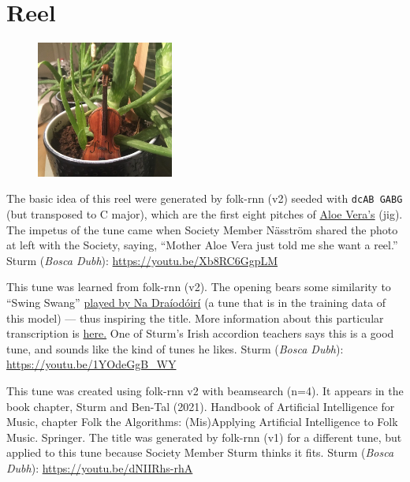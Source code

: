 \documentclass[a4paper,notitlepage,twoside]{book}
\begin{document}
\section{Reel}
{}  
\hypertarget{reel:AloeVeras}{}
\begin{figure}
\vspace{-0.3in}
\includegraphics[width=0.4\textwidth]{AloeVera2.jpg}
\end{figure}
The basic idea of this reel were generated by folk-rnn (v2) 
seeded with {\tt dcAB GABG} (but transposed to C major), 
which are the first eight pitches of \hyperlink{jig:AloeVeras}{Aloe Vera's} (jig).
The impetus of the tune came when Society Member Näsström shared the photo at left with the Society,
saying, ``Mother Aloe Vera just told me she want a reel.''
Sturm ({\em Bosca Dubh}): \url{https://youtu.be/Xb8RC6GgpLM}

\clearpage
{}
{}  
\hypertarget{reel:SwingSwangSwung}{}
This tune was learned from folk-rnn (v2).
The opening bears some similarity to ``Swing Swang'' 
\href{https://youtu.be/Fl3e4010epE?t=50}{played by Na Dra\'iod\'oir\'i}
(a tune that is in the training data of this model) ---
thus inspiring the title.
More information about this particular transcription is \href{https://highnoongmt.wordpress.com/2018/01/03/making-sense-of-the-folk-rnn-v2-model-part-5/}{here.}
One of Sturm's Irish accordion teachers says this is a good tune, and sounds like the kind of tunes he likes.
Sturm ({\em Bosca Dubh}): \url{https://youtu.be/1YOdeGgB_WY}

{}  
   
\hypertarget{reel:RoaringSillow}{}
This tune was created using folk-rnn v2 with beamsearch (n=4). It appears in the book chapter,
Sturm and Ben-Tal (2021). Handbook of Artificial Intelligence for Music, chapter Folk the Algorithms: (Mis)Applying Artificial Intelligence to Folk Music. Springer. 
The title was generated by folk-rnn (v1) for a different tune, 
but applied to this tune because Society Member Sturm thinks it fits.
Sturm ({\em Bosca Dubh}): \url{https://youtu.be/dNIIRhs-rhA}
\end{document}
